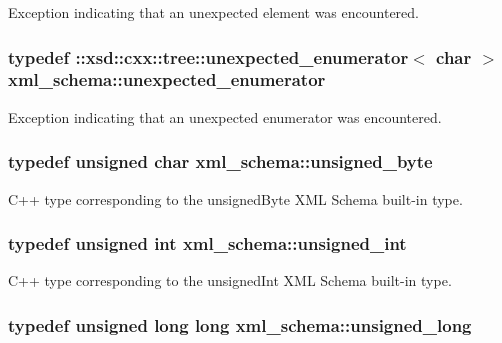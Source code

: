 Exception indicating that an unexpected element was encountered. 

\hypertarget{namespacexml__schema_aa088274f605e06cd53d9062265b5229c}{
\subsubsection[{unexpected\+\_\+enumerator}]{\setlength{\rightskip}{0pt plus 5cm}typedef \+::xsd\+::cxx\+::tree\+::unexpected\+\_\+enumerator$<$ char $>$ {\bf xml\+\_\+schema\+::unexpected\+\_\+enumerator}}}\label{namespacexml__schema_aa088274f605e06cd53d9062265b5229c}


Exception indicating that an unexpected enumerator was encountered. 

\hypertarget{namespacexml__schema_a876b68656d976c6343512f3d44fe8ca2}{
\subsubsection[{unsigned\+\_\+byte}]{\setlength{\rightskip}{0pt plus 5cm}typedef unsigned char {\bf xml\+\_\+schema\+::unsigned\+\_\+byte}}}\label{namespacexml__schema_a876b68656d976c6343512f3d44fe8ca2}


C++ type corresponding to the unsigned\+Byte X\+M\+L Schema built-\/in type. 

\hypertarget{namespacexml__schema_a85ca3205d8af287e149aac54535f57e7}{
\subsubsection[{unsigned\+\_\+int}]{\setlength{\rightskip}{0pt plus 5cm}typedef unsigned int {\bf xml\+\_\+schema\+::unsigned\+\_\+int}}}\label{namespacexml__schema_a85ca3205d8af287e149aac54535f57e7}


C++ type corresponding to the unsigned\+Int X\+M\+L Schema built-\/in type. 

\hypertarget{namespacexml__schema_a4413fbcf4c65ffc7aaafe465d72fcb33}{
\subsubsection[{unsigned\+\_\+long}]{\setlength{\rightskip}{0pt plus 5cm}typedef unsigned long long {\bf xml\+\_\+schema\+::unsigned\+\_\+long}}}\label{namespacexml__schema_a4413fbcf4c65ffc7aaafe465d72fcb33}


